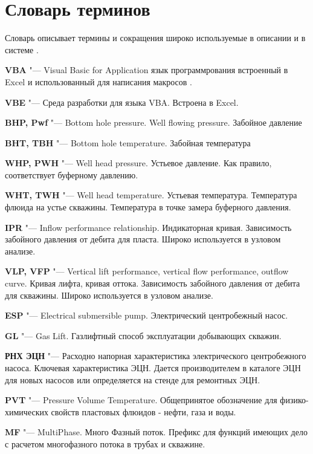 \chapter*{Словарь терминов}             %

Словарь описывает термины и сокращения широко используемые в описании и в системе \unf.


\textbf{VBA} "--- Visual Basic for Application язык программрования встроенный в Excel и использованный для написания макросов \unf.

\textbf{VBE} "--- Среда разработки для языка VBA. Встроена в Excel.

\textbf{BHP, Pwf} "--- Bottom hole pressure. Well flowing pressure. Забойное давление

\textbf{BHT, TBH} "--- Bottom hole temperature. Забойная температура

\textbf{WHP, PWH} "--- Well head pressure. Устьевое давление. Как правило, соответствует буферному давлению.

\textbf{WHT, TWH} "--- Well head temperature. Устьевая температура. Температура флюида на устье скважины. Температура в точке замера буферного давления.

\textbf{IPR} "--- Inflow performance relationship. Индикаторная кривая. Зависимость забойного давления от дебита для пласта. Широко используется в узловом анализе.

\textbf{VLP, VFP} "--- Vertical lift performance, vertical flow performance, outflow curve. Кривая лифта, кривая оттока. Зависимость забойного давления от дебита для скважины. Широко используется в узловом анализе.

\textbf{ESP} "--- Electrical submersible pump. Электрический центробежный насос.

\textbf{GL} "--- Gas Lift. Газлифтный способ эксплуатации добывающих скважин. 

\textbf{РНХ ЭЦН} "--- Расходно напорная характеристика электрического центробежного насоса. Ключевая характеристика ЭЦН. Дается производителем в каталоге ЭЦН для новых насосов или определяется на стенде для ремонтных ЭЦН. 

\textbf{PVT} "--- Pressure Volume Temperature. Общепринятое обозначение для физико-химических свойств пластовых флюидов - нефти, газа и воды.

\textbf{MF} "--- MultiPhase. Много Фазный поток. Префикс для функций имеющих дело с расчетом многофазного потока в трубах и скважине.

